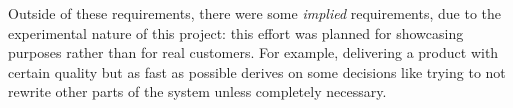 Outside of these requirements, there were some \emph{implied} requirements, due to the experimental nature of this project: this effort was planned for showcasing purposes rather than for real customers.
For example, delivering a product with certain quality but as fast as possible derives on some decisions like trying to not rewrite other parts of the system unless completely necessary.


